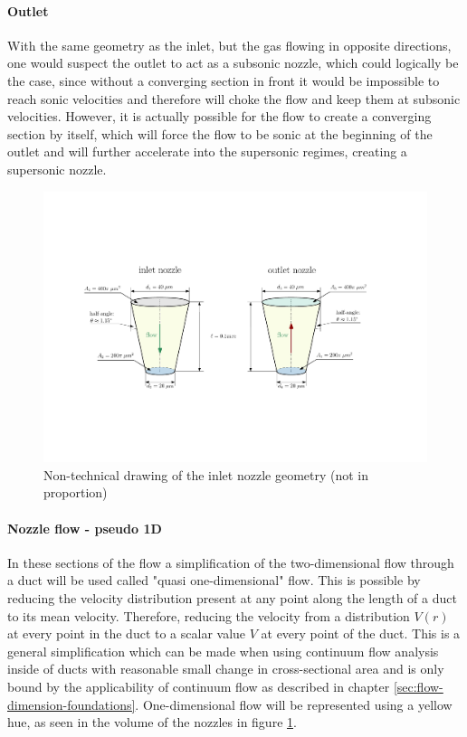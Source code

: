 	\paragraph{Outlet}
		With the same geometry as the inlet, but the gas flowing in opposite directions, one would suspect the outlet to act as a subsonic nozzle, which could logically be the case, since without a converging section in front it would be impossible to reach sonic velocities and therefore will choke the flow and keep them at subsonic velocities.
		However, it is actually possible for the flow to create a converging section by itself, which will force the flow to be sonic at the beginning of the outlet and will further accelerate into the supersonic regimes, creating a supersonic nozzle.
		\cite{jousten_handbook_2016}
	\begin{figure}[H]
	    \centering
	    \includegraphics[width=\textwidth]{src/03_analytical-work/fig_nozzle-geometries.pdf}
	    \caption{Non-technical drawing of the inlet nozzle geometry (not in proportion)}
	    \label{fig:geometry-nozzles}
	\end{figure}

	\paragraph{Nozzle flow - pseudo 1D}
		In these sections of the flow a simplification of the two-dimensional flow through a duct will be used called "quasi one-dimensional" flow.
		This is possible by reducing the velocity distribution present at any point along the length of a duct to its mean velocity.
		Therefore, reducing the velocity from a distribution $V(r)$ at every point in the duct to a scalar value $V$ at every point of the duct.
		This is a general simplification which can be made when using continuum flow analysis inside of ducts with reasonable small change in cross-sectional area and is only bound by the applicability of continuum flow as described in chapter \ref{sec:flow-dimension-foundations}.
		One-dimensional flow will be represented using a yellow hue, as seen in the volume of the nozzles in figure \ref{fig:geometry-nozzles}.
		\cite{anderson2021modern}
		\newpage
